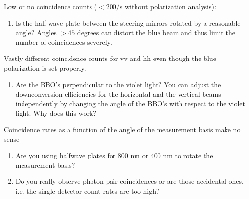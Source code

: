 \documentclass{../lab}
\begin{document}
\noindent Low or no coincidence counts ($<200$/s without polarization analysis):

\begin{enumerate}
    \item Is the half wave plate between the steering mirrors rotated by a reasonable angle? Angles $> 45$ degrees can distort the blue beam and thus limit the number of coincidences severely.
\end{enumerate}

\noindent Vastly different coincidence counts for vv and hh even though the blue polarization is set properly.

\begin{enumerate}
    \item Are the BBO's perpendicular to the violet light? You can adjust the downconversion efficiencies for the horizontal and the vertical beams independently by changing the angle of the BBO's with respect to the violet light. Why does this work?
\end{enumerate}

\noindent Coincidence rates as a function of the angle of the measurement basis make no sense

\begin{enumerate}
    \item Are you using halfwave plates for 800 nm or 400 nm to rotate the measurement basis?

    \item Do you really observe photon pair coincidences or are those accidental ones, i.e. the single-detector count-rates are too high?
\end{enumerate}
\end{document}
